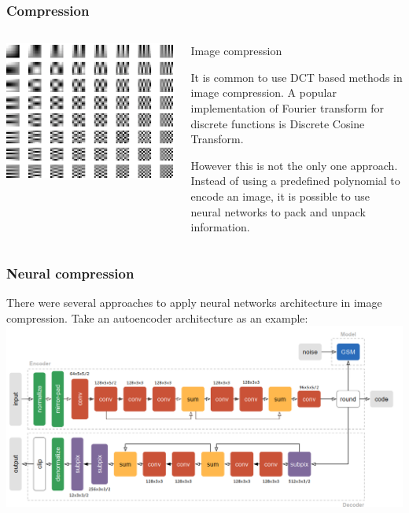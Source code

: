 \documentclass[10pt]{beamer}
\begin{document}
\begin{frame}
    \frametitle{Compression}
    \begin{columns}
        \begin{column}{0.5\textwidth}
            \includegraphics[width=\textwidth]{figure/2d-dct.png}
        \end{column}
        \begin{column}{0.5\textwidth}
            \begin{block}{Image compression}

                It is common to use DCT based methods in image compression. A popular implementation of Fourier transform for discrete functions is Discrete Cosine Transform.

                However this is not the only one approach. Instead of using a predefined polynomial to encode an image, it is possible to use neural networks to pack and unpack information.

            \end{block}
        \end{column}
    \end{columns}
\end{frame}

\begin{frame}
    \frametitle{Neural compression}
    There were several approaches to apply neural networks architecture in image compression. Take an autoencoder architecture as an example:
    \includegraphics[width=\textwidth]{figure/neural-compression.png}
\end{frame}
\end{document}
